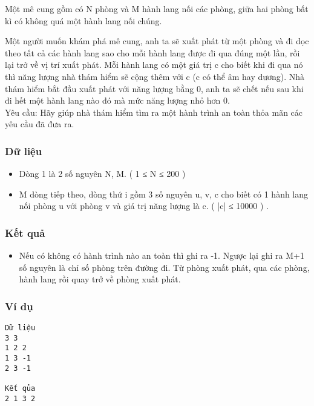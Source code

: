 

Một mê cung gồm có N phòng và M hành lang nối các phòng, giữa hai phòng bất kì có không quá một hành lang nối chúng.

Một người muốn khám phá mê cung, anh ta sẽ xuất phát từ một phòng và đi dọc theo tất cả các hành lang sao cho mỗi hành lang được đi qua đúng một lần, rồi lại trở về vị trí xuất phát. Mỗi hành lang có một giá trị c cho biết khi đi qua nó thì năng lượng nhà thám hiểm sẽ cộng thêm với c (c có thể âm hay dương). Nhà thám hiểm bắt đầu xuất phát với năng lượng bằng 0, anh ta sẽ chết nếu sau khi đi hết một hành lang nào đó mà mức năng lượng nhỏ hơn 0.
\\Yêu cầu: Hãy giúp nhà thám hiểm tìm ra một hành trình an toàn thỏa mãn các yêu cầu đã đưa ra.

\subsubsection{Dữ liệu}
\begin{itemize}
	\item Dòng 1 là 2 số nguyên N, M. ( 1 ≤ N ≤ 200 )
	\item M dòng tiếp theo, dòng thứ i gồm 3 số nguyên u, v, c cho biết có 1 hành lang nối phòng u với phòng v và giá trị năng lượng là c. ( |c| ≤ 10000 ) .
\end{itemize}

\subsubsection{Kết quả}
\begin{itemize}
	\item Nếu có không có hành trình nào an toàn thì ghi ra -1. Ngược lại ghi ra M+1 số nguyên là chỉ số phòng trên đường đi. Từ phòng xuất phát, qua các phòng, hành lang rồi quay trở về phòng xuất phát.
\end{itemize}

\subsubsection{Ví dụ}
\begin{verbatim}
Dữ liệu
3 3
1 2 2
1 3 -1
2 3 -1

Kết qủa
2 1 3 2
\end{verbatim}